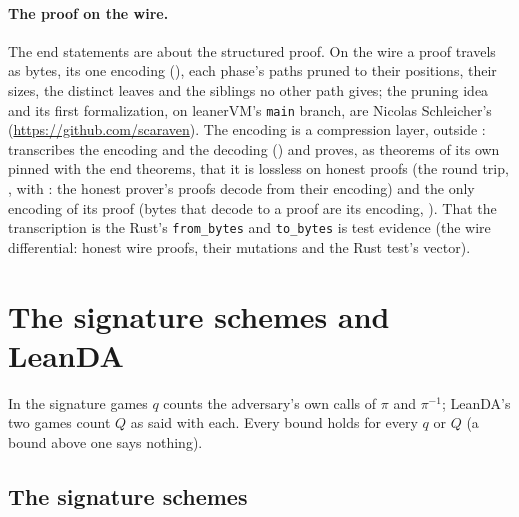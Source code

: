 \documentclass[11pt]{article}
\begin{document}
\paragraph{The proof on the wire.} The end statements are about the structured proof. On the wire
a proof travels as bytes, its one encoding (), each phase's
paths pruned to their positions, their sizes, the distinct leaves and the siblings no other path
gives; the pruning idea and its first formalization, on leanerVM's \texttt{main} branch, are
Nicolas Schleicher's (\url{https://github.com/scaraven}). The encoding is a compression layer, outside
:  transcribes the encoding and the decoding
() and proves, as theorems of its own pinned with the end
theorems, that it is lossless on honest proofs (the round trip, , with
: the honest prover's proofs decode from their
encoding) and the only encoding of its proof (bytes that decode to a proof are its encoding,
). That the transcription is the Rust's
\texttt{from\_bytes} and \texttt{to\_bytes} is test evidence (the wire differential: honest wire
proofs, their mutations and the Rust test's vector).

\section{The signature schemes and LeanDA}\label{sec:schemes}

In the signature games $q$ counts the adversary's own calls of $\pi$ and $\pi^{-1}$; LeanDA's two games count $Q$ as said with each. Every bound holds for every $q$ or $Q$ (a bound above one says nothing).

\subsection*{The signature schemes}
\end{document}
